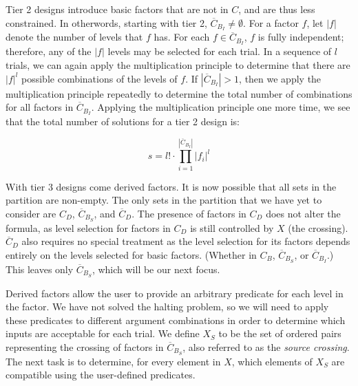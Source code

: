Tier 2 designs introduce basic factors that are not in $C$, and are thus less constrained. In otherwords, starting with tier 2, $\overline{C}_{B_I} \neq \emptyset$. For a factor $f$, let $|f|$ denote the number of levels that $f$ has. For each $f \in \overline{C}_{B_I}$, $f$ is fully independent; therefore, any of the $|f|$ levels may be selected for each trial. In a sequence of $l$ trials, we can again apply the multiplication principle to determine that there are $|f|^l$ possible combinations of the levels of $f$. If $|\overline{C}_{B_I}| > 1$, then we apply the multiplication principle repeatedly to determine the total number of combinations for all factors in $\overline{C}_{B_I}$. Applying the multiplication principle one more time, we see that the total number of solutions for a tier 2 design is:

\[
s = l! \cdot \prod_{i=1}^{|\overline{C}_{B_I}|} |f_i|^l
\]



With tier 3 designs come derived factors. It is now possible that all sets in the partition are non-empty. The only sets in the partition that we have yet to consider are $C_D$, $\overline{C}_{B_S}$, and $\overline{C}_D$. The presence of factors in $C_D$ does not alter the formula, as level selection for factors in $C_D$ is still controlled by $X$ (the crossing). $\overline{C}_D$ also requires no special treatment as the level selection for its factors depends entirely on the levels selected for basic factors. (Whether in $C_B$, $\overline{C}_{B_S}$, or $\overline{C}_{B_I}$.) This leaves only $\overline{C}_{B_S}$, which will be our next focus.

Derived factors allow the user to provide an arbitrary predicate for each level in the factor. We have not solved the halting problem, so we will need to apply these predicates to different argument combinations in order to determine which inputs are acceptable for each trial. We define $X_S$ to be the set of ordered pairs representing the crossing of factors in $\overline{C}_{B_S}$, also referred to as the \textit{source crossing}. The next task is to determine, for every element in $X$, which elements of $X_S$ are compatible using the user-defined predicates.


